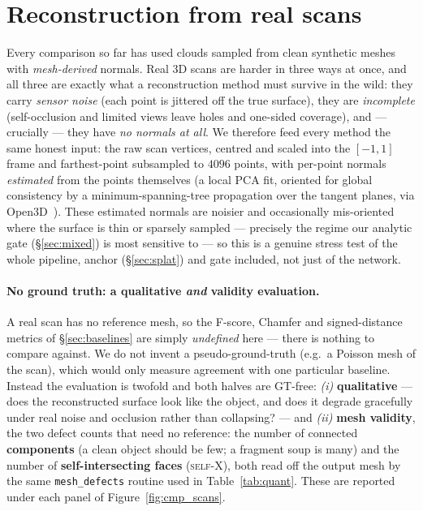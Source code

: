 \section{Reconstruction from real scans}\label{sec:scans}
Every comparison so far has used clouds sampled from clean synthetic meshes with \emph{mesh-derived} normals.
Real $3$D scans are harder in three ways at once, and all three are exactly what a reconstruction method must
survive in the wild: they carry \emph{sensor noise} (each point is jittered off the true surface), they are
\emph{incomplete} (self-occlusion and limited views leave holes and one-sided coverage), and --- crucially ---
they have \emph{no normals at all}.  We therefore feed every method the same honest input: the raw scan
vertices, centred and scaled into the $[-1,1]$ frame and farthest-point subsampled to $4096$ points, with
per-point normals \emph{estimated} from the points themselves (a local PCA fit, oriented for global
consistency by a minimum-spanning-tree propagation over the tangent planes, via Open3D~\cite{open3d}).  These
estimated normals are noisier and occasionally mis-oriented where the surface is thin or sparsely sampled ---
precisely the regime our analytic gate (\S\ref{sec:mixed}) is most sensitive to --- so this is a genuine
stress test of the whole pipeline, anchor (\S\ref{sec:splat}) and gate included, not just of the network.

\paragraph{No ground truth: a qualitative \emph{and} validity evaluation.}  A real scan has no reference
mesh, so the F-score, Chamfer and signed-distance metrics of \S\ref{sec:baselines} are simply
\emph{undefined} here --- there is nothing to compare against.  We do not invent a pseudo-ground-truth (e.g.\
a Poisson mesh of the scan), which would only measure agreement with one particular baseline.  Instead the
evaluation is twofold and both halves are GT-free: \emph{(i)} \textbf{qualitative} --- does the reconstructed
surface look like the object, and does it degrade gracefully under real noise and occlusion rather than
collapsing? --- and \emph{(ii)} \textbf{mesh validity}, the two defect counts that need no reference: the
number of connected \textbf{components} (a clean object should be few; a fragment soup is many) and the number
of \textbf{self-intersecting faces} (\textsc{self-X}), both read off the output mesh by the same
\texttt{mesh\_defects} routine used in Table~\ref{tab:quant}.  These are reported under each panel of
Figure~\ref{fig:cmp_scans}.

